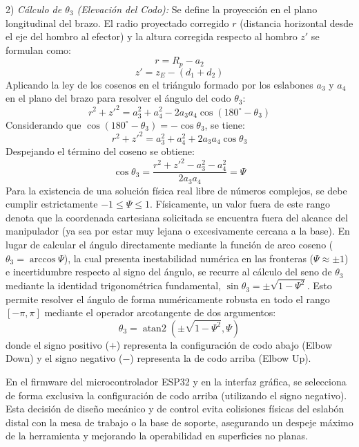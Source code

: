 \documentclass[conference,a4paper]{IEEEtran}
\begin{document}
2) \textit{Cálculo de $\theta_3$ (Elevación del Codo):}
Se define la proyección en el plano longitudinal del brazo. El radio proyectado corregido $r$ (distancia horizontal desde el eje del hombro al efector) y la altura corregida respecto al hombro $z'$ se formulan como:
\begin{equation}
r = R_p - a_2
\end{equation}
\begin{equation}
z' = z_E - (d_1 + d_2)
\end{equation}
Aplicando la ley de los cosenos en el triángulo formado por los eslabones $a_3$ y $a_4$ en el plano del brazo para resolver el ángulo del codo $\theta_3$:
\begin{equation}
r^2 + z'^2 = a_3^2 + a_4^2 - 2 a_3 a_4 \cos(180^\circ - \theta_3)
\end{equation}
Considerando que $\cos(180^\circ - \theta_3) = -\cos\theta_3$, se tiene:
\begin{equation}
r^2 + z'^2 = a_3^2 + a_4^2 + 2 a_3 a_4 \cos\theta_3
\end{equation}
Despejando el término del coseno se obtiene:
\begin{equation}
\cos\theta_3 = \frac{r^2 + z'^2 - a_3^2 - a_4^2}{2 a_3 a_4} = \Psi
\label{eq:ik_cos3}
\end{equation}
Para la existencia de una solución física real libre de números complejos, se debe cumplir estrictamente $-1 \le \Psi \le 1$. Físicamente, un valor fuera de este rango denota que la coordenada cartesiana solicitada se encuentra fuera del alcance del manipulador (ya sea por estar muy lejana o excesivamente cercana a la base). En lugar de calcular el ángulo directamente mediante la función de arco coseno ($\theta_3 = \arccos\Psi$), la cual presenta inestabilidad numérica en las fronteras ($\Psi \approx \pm 1$) e incertidumbre respecto al signo del ángulo, se recurre al cálculo del seno de $\theta_3$ mediante la identidad trigonométrica fundamental, $\sin\theta_3 = \pm\sqrt{1 - \Psi^2}$. Esto permite resolver el ángulo de forma numéricamente robusta en todo el rango $[-\pi, \pi]$ mediante el operador arcotangente de dos argumentos:
\begin{equation}
\theta_3 = \operatorname{atan2}\left( \pm\sqrt{1 - \Psi^2}, \Psi \right)
\label{eq:ik_theta3}
\end{equation}
donde el signo positivo ($+$) representa la configuración de codo abajo (Elbow Down) y el signo negativo ($-$) representa la de codo arriba (Elbow Up). 

En el firmware del microcontrolador ESP32 y en la interfaz gráfica, se selecciona de forma exclusiva la configuración de codo arriba (utilizando el signo negativo). Esta decisión de diseño mecánico y de control evita colisiones físicas del eslabón distal con la mesa de trabajo o la base de soporte, asegurando un despeje máximo de la herramienta y mejorando la operabilidad en superficies no planas.
\end{document}
